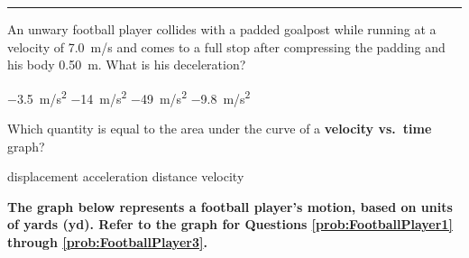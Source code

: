 \documentclass{exam}
\begin{document}
\begin{questions}
\vspace{1em}
\hrule

\question %
An unwary football player collides with a padded goalpost while running at a velocity of \SI{7.0}{m/s} and comes to a full stop after compressing the padding and his body \SI{0.50}{m}. What is his deceleration?

\begin{choices}
\choice \SI{-3.5}{m/s^2}
\choice \SI{-14}{m/s^2}
\correctchoice \SI{-49}{m/s^2}
\choice \SI{-9.8}{m/s^2}
\end{choices}


















\question
Which quantity is equal to the area under the curve of a \textbf{velocity vs.~time} graph?
\begin{choices}
\correctchoice displacement
\choice acceleration
\choice distance
\choice velocity
\end{choices}




\clearpage
\begin{EnvUplevel}
\textbf{The graph below represents a football player's motion, based on units of yards (yd). Refer to the graph for Questions \ref{prob:FootballPlayer1} through \ref{prob:FootballPlayer3}.}
\end{EnvUplevel}


\end{questions}
\end{document}
